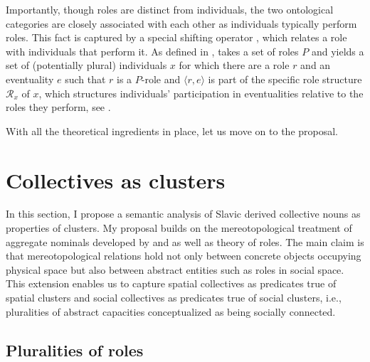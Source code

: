 \documentclass[output=paper]{langscibook}
\begin{document}
Importantly, though roles are distinct from individuals, the two ontological categories are closely associated with each other as individuals typically perform roles. This fact is captured by a special shifting operator , which relates a role with individuals that perform it. As defined in ,  takes a set of roles $P$ and yields a set of (potentially plural) individuals $x$ for which there are a role $r$ and an eventuality $e$ such that $r$ is a $P$-role and $\langle r,e\rangle$ is part of the specific role structure $\mathscr{R}_x$ of $x$, which structures individuals' participation in eventualities relative to the roles they perform, see  \citep[451]{zobel2017sensitivity}. 

\label{wan:form:play}
\label{wan:form:role-structure}
\z

\noindent With all the theoretical ingredients in place, let us move on to the proposal.

\section{Collectives as clusters}\label{wan:sec:collectives-as-clusters}

\begin{sloppypar}
In this section, I propose a semantic analysis of Slavic derived collective nouns as properties of clusters. My proposal builds on the mereotopological treatment of aggregate nominals developed by \citet{grimm2012number} and \citet{grimm_docekal-toappear-counting} as well as  theory of roles. The main claim is that mereotopological relations hold not only between concrete objects occupying physical space but also between abstract entities such as roles in social space. This extension enables us to capture spatial collectives as predicates true of spatial clusters and social collectives as predicates true of social clusters, i.e., pluralities of abstract capacities conceptualized as being socially connected.
\end{sloppypar}

\subsection{Pluralities of roles}\label{wan:sect:pluralities-of-roles}
\end{document}

